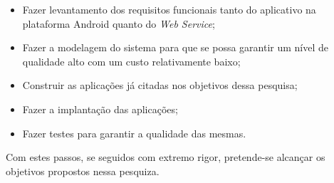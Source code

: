 \begin{itemize}

	\item Fazer levantamento dos requisitos funcionais tanto do aplicativo na
	plataforma Android quanto do \textit{Web Service};

	\item Fazer a modelagem do sistema para que se possa garantir um nível de
	qualidade alto com um custo relativamente baixo;

	\item Construir as aplicações já citadas nos objetivos dessa pesquisa;

	\item Fazer a implantação das aplicações;

	\item Fazer testes para garantir a qualidade das mesmas.

\end{itemize}

	\par Com estes passos, se seguidos com extremo rigor, pretende-se alcançar os
objetivos propostos nessa pesquiza.


\pagebreak
